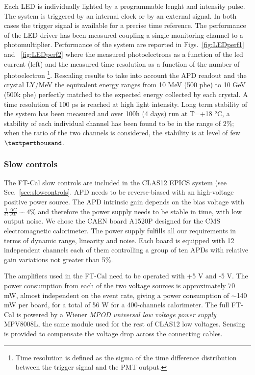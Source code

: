 Each LED is individually lighted by a programmable
lenght and intensity pulse. The
system is triggered by an internal clock or by
an external signal. In both cases the trigger
signal is available for a precise time reference.
The performance of the LED driver
has been measured coupling a single monitoring
channel to a photomultiplier. Performance of the system are reported in Figs.~\ref{fig:LEDperf1} and ~\ref{fig:LEDperf2} where the measured photoelectrons
as a function of the led current (left) and the measured time resolution as
a function of the number of photoelectron \footnote{Time resolution is defined as the sigma of the time difference distribution
between the trigger signal and the
PMT output.}. Rescaling
results to take into account the APD readout
and the crystal LY/MeV the equivalent
energy ranges from 10 MeV (500 phe) to 10
GeV (500k phe) perfectly matched to the expected
energy collected by each crystal. A time resolution
of 100 ps is reached at high light
intensity. Long term stability of the system has been measured and over 100h (4 days) run at
T=+18 $^o$C, a stability of each individual
channel has been found to be in the range of 2$\%$;  when the ratio
of the two channels is considered,
the stability is at level of few $\textperthousand$.

\subsubsection{Slow controls}
The FT-Cal slow controls are included in the CLAS12 EPICS system (see Sec.~\ref{sec:slowcontrols}.
APD  needs to be reverse-biased
with an high-voltage positive power
source. The APD intrinsic
gain depends on the bias voltage with
$\frac{1}{G}\frac{\Delta G}{\Delta V} \sim4 \%$
and therefore the power supply
needs to be stable in time, with low output
noise. We chose the  CAEN board A1520P   designed
for the   CMS electromagnetic
calorimeter. The power supply fulfills  all our requirements in
terms of dynamic range, linearity and noise.
Each board is equipped with 12 independent
channels each of them controlling a group of ten APDs
 with relative
gain variations not greater than 5$\%$.

The amplifiers used in the FT-Cal need to
be operated with +5 V and -5 V.
The power consumption from
each of the two voltage sources is approximately
70 mW, almost independent on the
event rate, giving a power consumption of
$\sim$140 mW per board, for a total of 56 W for
a 400-channels calorimeter. 
The full FT-Cal is powered by a Wiener
{\it MPOD universal low voltage power supply} MPV8008L,
the same module used for the rest of CLAS12 low voltages.
Sensing is provided
to compensate the voltage drop across
the connecting cables.

